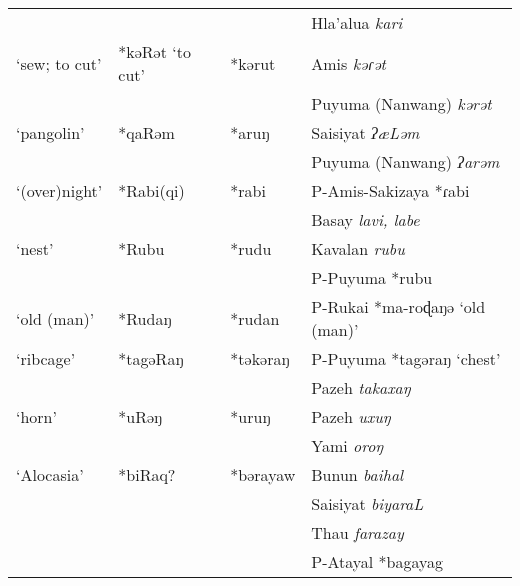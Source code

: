 \documentclass[12pt]{article}
\begin{document}
\begin{longtable}[c]{llll}
              &                 &                        & Hla'alua \textit{kari}                                 \\
`sew; to cut' & *kəRət `to cut' & *kərut                 & Amis \textit{kəɾət}                                    \\
              &                 &                        & Puyuma (Nanwang) \textit{kərət}                        \\
`pangolin'    & *qaRəm          & *aruŋ                  & Saisiyat \textit{ʔæLəm}                                \\
              &                 &                        & Puyuma (Nanwang) \textit{ʔarəm}                        \\
`(over)night' & *Rabi(qi)       & *rabi                  & P-Amis-Sakizaya *ɾabi                                  \\
              &                 &                        & Basay \textit{lavi, labe}                              \\
`nest'        & *Rubu           & *rudu                  & Kavalan \textit{rubu}                                  \\
              &                 &                        & P-Puyuma *rubu                                         \\
`old (man)'   & *Rudaŋ          & *rudan                 & P-Rukai *ma-roɖaŋə `old (man)'                         \\
`ribcage'     & *tagəRaŋ        & *təkəraŋ               & P-Puyuma *tagəraŋ `chest'                              \\
              &                 &                        & Pazeh \textit{takaxaŋ}                                 \\
`horn'        & *uRəŋ           & *uruŋ                  & Pazeh \textit{uxuŋ}                                    \\
              &                 &                        & Yami \textit{oroŋ}                                     \\
`Alocasia'    & *biRaq?         & *bərayaw               & Bunun \textit{baihal}                                  \\
              &                 &                        & Saisiyat \textit{biyaraL}                              \\
              &                 &                        & Thau \textit{farazay}                                  \\
              &                 &                        & P-Atayal *bagayag                                      \\ \hline
\end{longtable}
\endgroup
\end{document}
